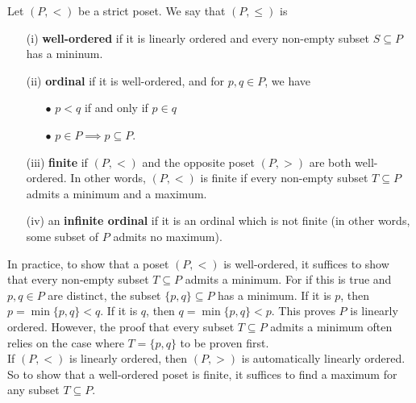 \begin{definition} \label{well-ordered-sets}
    Let $(P,<)$ be a strict poset. We say that $(P, \le)$ is 
    \\

    \begin{itemize}
        \item[(i)] \textbf{well-ordered} if it is linearly ordered and every non-empty subset $S \subseteq P$ has a mininum.
        \\

        \item[(ii)] \textbf{ordinal} if it is well-ordered, and for $p,q \in P$, we have
        \\

            \begin{itemize}
                \item[$\bullet$] $p < q$ if and only if $p \in q$
                \\

                \item[$\bullet$] $p \in P \implies p \subseteq P$.
                \\
            \end{itemize}

        \item[(iii)] \textbf{finite} if $(P, <)$ and the opposite poset $(P, >)$ are both well-ordered. In other words, $(P,<)$ is finite if every non-empty subset $T \subseteq P$ admits a minimum and a maximum.
        \\

        \item[(iv)] an \textbf{infinite ordinal} if it is an ordinal which is not finite (in other words, some subset of $P$ admits no maximum).
    \end{itemize}
\end{definition}

\begin{remark}
    In practice, to show that a poset $(P,<)$ is well-ordered, it suffices to show that every non-empty subset $T \subseteq P$ admits a minimum. For if this is true and $p,q \in P$ are distinct, the subset $\{p,q\} \subseteq P$ has a minimum. If it is $p$, then $p = \min\{p,q\} < q$. If it is $q$, then $q = \min\{p,q\} < p$. This proves $P$ is linearly ordered. However, the proof that every subset $T \subseteq P$ admits a minimum often relies on the case where $T = \{p,q\}$ to be proven first.
    \\

    If $(P, <)$ is linearly ordered, then $(P, >)$ is automatically linearly ordered. So to show that a well-ordered poset is finite, it suffices to find a maximum for any subset $T \subseteq P$.
\end{remark}

